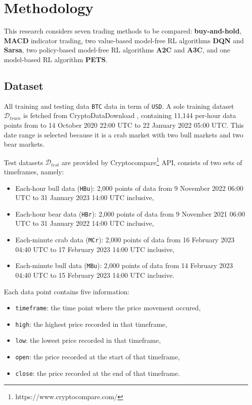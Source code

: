 \chapter{Methodology}
\label{methodology}

This research considers seven trading methods to be compared: \textbf{buy-and-hold}, \textbf{MACD} indicator trading, two value-based model-free RL algorithms \textbf{DQN} and \textbf{Sarsa}, two policy-based model-free RL algorithms \textbf{A2C} and \textbf{A3C}, and one model-based RL algorithm \textbf{PETS}.

\section{Dataset}
All training and testing data \texttt{BTC} data in term of \texttt{USD}. A sole training dataset $\mathcal{D}_{train}$ is fetched from CryptoDataDownload \cite{DATA01}, containing 11,144 per-hour data points from to 14 October 2020 22:00 UTC to 22 January 2022 05:00 UTC. This date range is selected because it is a crab market with two bull markets and two bear markets.

Test datasets $\mathcal{D}_{test}$ are provided by Cryptocompare\footnote{https://www.cryptocompare.com/} API, consists of two sets of timeframes, namely:
\begin{itemize}
	\item Each-hour bull data (\texttt{HBu}): 2,000 points of data from 9 November 2022 06:00 UTC to 31 January 2023 14:00 UTC inclusive,
	\item Each-hour bear data (\texttt{HBr}): 2,000 points of data from 9 November 2021 06:00 UTC to 31 January 2022 14:00 UTC inclusive,
	\item Each-minute crab data (\texttt{MCr}): 2,000 points of data from 16 February 2023 04:40 UTC to 17 February 2023 14:00 UTC inclusive,		
	\item Each-minute bull data (\texttt{MBu}): 2,000 points of data from 14 February 2023 04:40 UTC to 15 February 2023 14:00 UTC inclusive.
\end{itemize}

Each data point contains five information:
\begin{itemize}
	\item \texttt{timeframe}: the time point where the price movement occured,
	\item \texttt{high}: the highest price recorded in that timeframe,
	\item \texttt{low}: the lowest price recorded in that timeframe,
	\item \texttt{open}: the price recorded at the start of that timeframe,
	\item \texttt{close}: the price recorded at the end of that timeframe.
\end{itemize}

